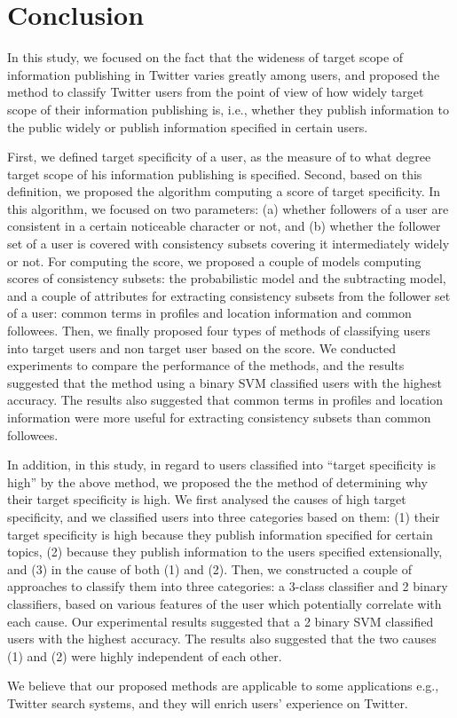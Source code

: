 \section{Conclusion}
\label{sec:Conclusion}

In this study, we focused on the fact that the wideness of target scope of
information publishing in Twitter varies greatly among users, and
proposed the method to classify Twitter
users from the point of view of how widely target scope of their
information publishing is, i.e., whether they publish information to the
public widely or publish information specified in certain users.

First, we defined target specificity of a user, as the
measure of to what degree target scope of his information publishing is
specified.  Second, based on this definition, we proposed the algorithm
computing a score of target specificity.  In this algorithm, we
focused on two parameters: (a) whether followers of a user are
consistent in a certain noticeable character or not, and (b) whether the
follower set of a user is covered with consistency subsets covering it
intermediately widely or not.
For computing the score, we proposed a couple of models computing
scores of consistency subsets: the
probabilistic model and the subtracting model, and a couple of
attributes for extracting consistency subsets from the follower set of a
user: common terms in profiles and location information and common
followees.
Then, we finally proposed four types of methods of classifying users
into target users and non target user based on the score.  We conducted
experiments to compare the performance of the methods, and the results
suggested that the method using a binary SVM classified users with the
highest accuracy.  The results also suggested that common terms in profiles
and location information were more useful for extracting consistency
subsets than common followees.

In addition, in this study, in regard to users classified into
``target specificity is high'' by the above method, we proposed the
the method of determining why their target
specificity is high.  We first analysed the causes of high target
specificity, and we classified users into three
categories based on them: (1) their target specificity is high because
they publish information specified for certain topics,
(2) because they publish information to the users specified extensionally, and
(3) in the cause of both (1) and (2).  Then, we constructed
a couple of approaches to classify them into three categories: a 3-class
classifier and 2 binary classifiers, based on various features of the
user which potentially correlate with each cause.  Our experimental
results suggested that a 2 binary SVM classified users with the highest
accuracy. The results also suggested that the two causes (1) and (2)
were highly independent of each other.

We believe that our proposed methods are applicable to some applications
e.g., Twitter search systems, and they will enrich users' experience on
Twitter.